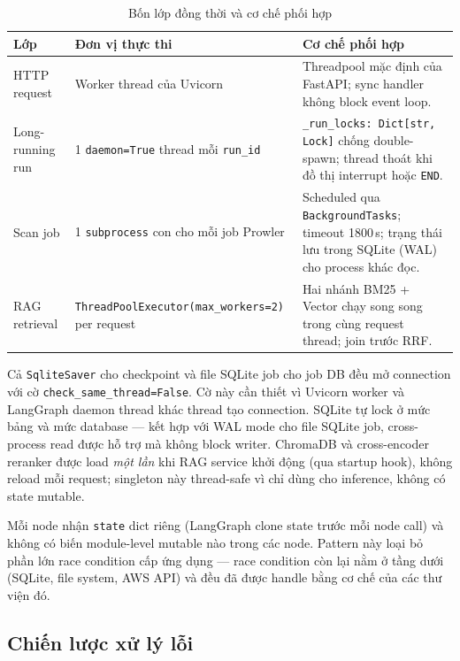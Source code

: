 \begin{table}[!htb]
  \centering
  \caption{Bốn lớp đồng thời và cơ chế phối hợp}
  \label{tab:concurrency_layers}
  \renewcommand{\arraystretch}{1.2}
  \begin{tabular}{|p{3.0cm}|p{4.5cm}|p{6.0cm}|}
    \hline
    \textbf{Lớp} & \textbf{Đơn vị thực thi} & \textbf{Cơ chế phối hợp} \\ \hline
    HTTP request & Worker thread của Uvicorn & Threadpool mặc định của FastAPI; sync handler không block event loop. \\ \hline
    Long-running run & 1 \texttt{daemon=True} thread mỗi \texttt{run\_id} & \texttt{\_run\_locks: Dict[str, Lock]} chống double-spawn; thread thoát khi đồ thị interrupt hoặc \texttt{END}. \\ \hline
    Scan job & 1 \texttt{subprocess} con cho mỗi job Prowler & Scheduled qua \texttt{BackgroundTasks}; timeout 1800\,s; trạng thái lưu trong SQLite (WAL) cho process khác đọc. \\ \hline
    RAG retrieval & \texttt{ThreadPoolExecutor}\newline\texttt{(max\_workers=2)} per request & Hai nhánh BM25 + Vector chạy song song trong cùng request thread; join trước RRF. \\ \hline
  \end{tabular}
\end{table}

Cả \texttt{SqliteSaver} cho checkpoint và file SQLite job cho job DB đều mở connection với cờ \texttt{check\_same\_thread=False}. Cờ này cần thiết vì Uvicorn worker và LangGraph daemon thread khác thread tạo connection. SQLite tự lock ở mức bảng và mức database — kết hợp với WAL mode cho file SQLite job, cross-process read được hỗ trợ mà không block writer. ChromaDB và cross-encoder reranker được load \emph{một lần} khi RAG service khởi động (qua startup hook), không reload mỗi request; singleton này thread-safe vì chỉ dùng cho inference, không có state mutable.

Mỗi node nhận \texttt{state} dict riêng (LangGraph clone state trước mỗi node call) và không có biến module-level mutable nào trong các node. Pattern này loại bỏ phần lớn race condition cấp ứng dụng — race condition còn lại nằm ở tầng dưới (SQLite, file system, AWS API) và đều đã được handle bằng cơ chế của các thư viện đó.

\subsection{Chiến lược xử lý lỗi}
\label{sub:error_strategy}

